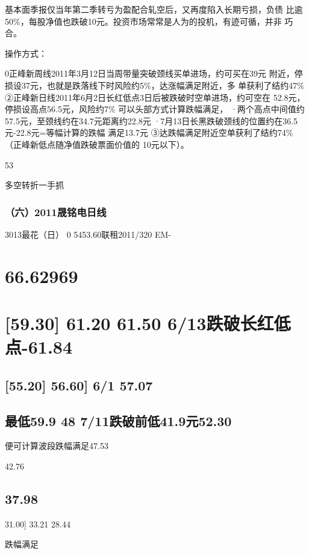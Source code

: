 \documentclass{article}
\begin{document}
基本面季报仅当年第二季转亏为盈配合轧空后，又再度陷入长期亏损，负债 比逾50\%，每股净值也跌破10元。投资市场常常是人为的投机，有迹可循，并非 巧合。

操作方式：

0正峰新周线2011年3月12日当周带量突破颈线买单进场，约可买在39元 附近，停损设37元，也就是跌落线下时风险约5\%，达涨幅满足附近，多 单获利了结约47\% ②正峰新日线2011年6月2日长红低点3日后被跌破时空单进场，约可空在 52.8元，停损设高点56.5元，风险约7\% 可以头部方式计算跌幅满足， ·两个高点中间值约57.5元，至颈线约在34.7元距离约22.8元 ·7月13日长黑跌破颈线的位置约在36.5元-22.8元=等幅计算的跌幅 满足13.7元 ③达跌幅满足附近空单获利了结约74\%（正峰新低点随净值跌破票面价值的 10元以下）。

53

\clearpage

多空转折一手抓

\subsubsection{（六）2011晟铭电日线}

3013最花（日） 0 5453.60联租2011/320 EM-

\section{66.62969}

\section{[59.30] 61.20 61.50 6/13跌破长红低点-61.84}

\subsection{[55.20] 56.60] 6/1 57.07}

\subsection{最低59.9 48 7/11跌破前低41.9元52.30}

便可计算波段跌幅满足47.53

42.76

\subsection{37.98}

31.00] 33.21 28.44

跌幅满足
\end{document}

